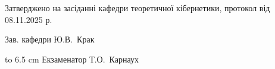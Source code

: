 \documentclass[12pt, ukrainian]{article}
\begin{document}
{\smallskip\smallskip \begin {scriptsize} Затверджено на засіданні кафедри теоретичної кібернетики, протокол   від   08.11.2025 р.\par\smallskip\smallskip\smallskip\smallskip
{\parbox {6.5 cm} {Зав. кафедри \dotfill Ю.В.~Крак}}\hspace {0.7cm} {\hbox to 6.5 cm { Екзаменатор \dotfill Т.О.~Карнаух}} \end{scriptsize}}
\newpage
\end{document}
